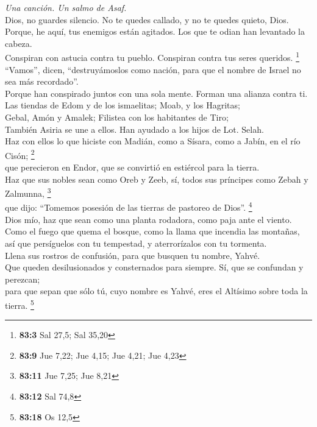 \emph{Una canción. Un salmo de Asaf.}\\
 Dios, no guardes silencio. No te quedes callado, y no te
quedes quieto, Dios.\\
 Porque, he aquí, tus enemigos están agitados. Los que te
odian han levantado la cabeza.\\
 Conspiran con astucia contra tu pueblo. Conspiran contra
tus seres queridos. \footnote{\textbf{83:3} Sal 27,5; Sal 35,20}\\
 ``Vamos'', dicen, ``destruyámoslos como nación, para que
el nombre de Israel no sea más recordado''.\\
 Porque han conspirado juntos con una sola mente. Forman
una alianza contra ti.\\
 Las tiendas de Edom y de los ismaelitas; Moab, y los
Hagritas;\\
 Gebal, Amón y Amalek; Filistea con los habitantes de
Tiro;\\
 También Asiria se une a ellos. Han ayudado a los hijos de
Lot. Selah.\\
 Haz con ellos lo que hiciste con Madián, como a Sísara,
como a Jabín, en el río Cisón; \footnote{\textbf{83:9} Jue 7,22; Jue
  4,15; Jue 4,21; Jue 4,23}\\
 que perecieron en Endor, que se convirtió en estiércol
para la tierra.\\
 Haz que sus nobles sean como Oreb y Zeeb, sí, todos sus
príncipes como Zebah y Zalmunna, \footnote{\textbf{83:11} Jue 7,25; Jue
  8,21}\\
 que dijo: ``Tomemos posesión de las tierras de pastoreo
de Dios''. \footnote{\textbf{83:12} Sal 74,8}\\
 Dios mío, haz que sean como una planta rodadora, como
paja ante el viento.\\
 Como el fuego que quema el bosque, como la llama que
incendia las montañas,\\
 así que persíguelos con tu tempestad, y aterrorízalos
con tu tormenta.\\
 Llena sus rostros de confusión, para que busquen tu
nombre, Yahvé.\\
 Que queden desilusionados y consternados para siempre.
Sí, que se confundan y perezcan;\\
 para que sepan que sólo tú, cuyo nombre es Yahvé, eres
el Altísimo sobre toda la tierra. \footnote{\textbf{83:18} Os 12,5}

